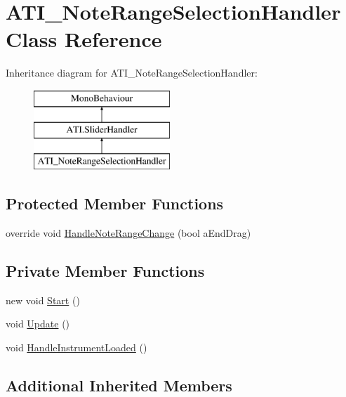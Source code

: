 \hypertarget{class_a_t_i___note_range_selection_handler}{}\section{A\+T\+I\+\_\+\+Note\+Range\+Selection\+Handler Class Reference}
\label{class_a_t_i___note_range_selection_handler}
Inheritance diagram for A\+T\+I\+\_\+\+Note\+Range\+Selection\+Handler\+:\begin{figure}[H]
\begin{center}
\leavevmode
\includegraphics[height=3.000000cm]{class_a_t_i___note_range_selection_handler}
\end{center}
\end{figure}
\subsection*{Protected Member Functions}
\begin{DoxyCompactItemize}
\item 
override void \hyperlink{class_a_t_i___note_range_selection_handler_a87e90cac12626a0cb547d6e40c6e8260}{Handle\+Note\+Range\+Change} (bool a\+End\+Drag)
\end{DoxyCompactItemize}
\subsection*{Private Member Functions}
\begin{DoxyCompactItemize}
\item 
new void \hyperlink{class_a_t_i___note_range_selection_handler_a0840b64bb232377676cdb9cef62349f4}{Start} ()
\item 
void \hyperlink{class_a_t_i___note_range_selection_handler_ad1368483644433a2e1149790664676e8}{Update} ()
\item 
void \hyperlink{class_a_t_i___note_range_selection_handler_a4063aee2ca06e3fbe11f4cd899b5581f}{Handle\+Instrument\+Loaded} ()
\end{DoxyCompactItemize}
\subsection*{Additional Inherited Members}



